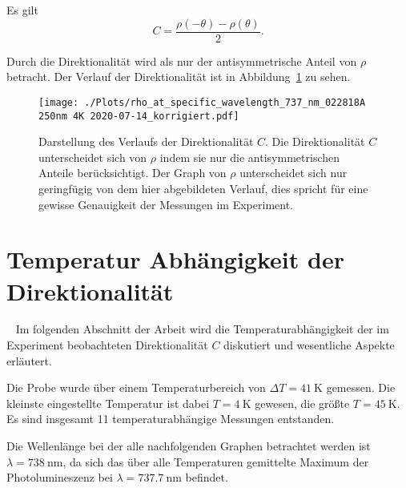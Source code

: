 Es gilt 
\begin{equation}
    C= \frac{\rho(-\theta)-\rho(\theta)}{2}.
    \label{eq:C} 
\end{equation}

Durch die Direktionalität wird als nur der antisymmetrische Anteil von $\rho$ betracht.
Der Verlauf der Direktionalität ist in Abbildung~\ref{fig:dir_kor} zu sehen.
\begin{figure}
    \centering
    \texttt{[image: ./Plots/rho\_at\_specific\_wavelength\_737\_nm\_022818A 250nm 4K 2020-07-14\_korrigiert.pdf]}
    \caption{Darstellung des Verlaufs der Direktionalität $C$.
     Die Direktionalität $C$ unterscheidet sich von $\rho$ indem sie nur die antisymmetrischen
     Anteile berücksichtigt. Der Graph von $\rho$ unterscheidet sich nur geringfügig von dem hier 
     abgebildeten Verlauf, dies spricht für eine gewisse Genauigkeit der Messungen im Experiment. }
    \label{fig:dir_kor}
\end{figure}
\FloatBarrier


\section{Temperatur Abhängigkeit der Direktionalität}~\label{sec:Temperatur Abhaengigkeit der Direktionalitaet}
Im folgenden Abschnitt der Arbeit wird die Temperaturabhängigkeit der im Experiment
beobachteten Direktionalität $C$ diskutiert und wesentliche Aspekte erläutert.

Die Probe wurde über einem Temperaturbereich von $ \Delta T =\SI{41}{\kelvin} $ gemessen.
Die kleinste eingestellte Temperatur ist dabei $T =\SI{4}{\kelvin}$ gewesen, die größte 
$T =\SI{45}{\kelvin}$.
Es sind insgesamt 11 temperaturabhängige Messungen entstanden.

Die Wellenlänge bei der alle nachfolgenden Graphen betrachtet werden ist\\ $\lambda =\SI{738}{\nano\meter}$,
da sich das über alle Temperaturen gemittelte Maximum der Photolumineszenz bei
$\lambda =\SI{737,7}{\nano\meter}$ befindet.

